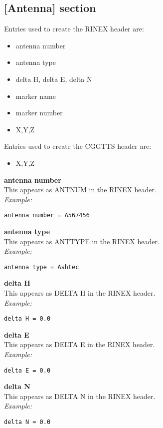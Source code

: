 \subsection{[Antenna] section}

Entries used to create the RINEX header are:
\begin{itemize}
\item antenna number
\item antenna type
\item delta H, delta E, delta N
\item marker name
\item marker number
\item X,Y,Z
\end{itemize}

Entries used to create the CGGTTS header are:
\begin{itemize}
\item X,Y,Z
\end{itemize}

\hypertarget{h:antenna}{}
{\bfseries antenna number}\\ \hypertarget{h:antenna_antenna_number}{}
This appears as ANTNUM in the RINEX header.\\
\textit{Example:}
\begin{lstlisting}
antenna number = A567456
\end{lstlisting}

{\bfseries antenna type}\\ \hypertarget{h:antenna_antenna_type}{}
This appears as ANTTYPE in the RINEX header.\\
\textit{Example:}
\begin{lstlisting}
antenna type = Ashtec
\end{lstlisting}

{\bfseries delta H}\\ \hypertarget{h:antenna_delta_h}{}
This appears as DELTA H in the RINEX header.\\
\textit{Example:}
\begin{lstlisting}
delta H = 0.0
\end{lstlisting}

{\bfseries delta E}\\ \hypertarget{h:antenna_delta_e}{}
This appears as DELTA E in the RINEX header.\\
\textit{Example:}
\begin{lstlisting}
delta E = 0.0
\end{lstlisting}

{\bfseries delta N}\\ \hypertarget{h:antenna_delta_n}{}
This appears as DELTA N in the RINEX header.\\
\textit{Example:}
\begin{lstlisting}
delta N = 0.0
\end{lstlisting}

